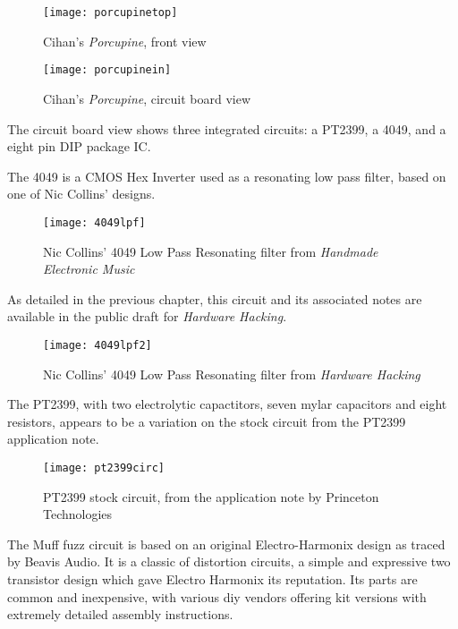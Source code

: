 	\citep{cihan2015}

	\begin{figure}[h!]
	  \caption{Cihan's \emph{Porcupine}, front view}
	  \centering
	    \texttt{[image: porcupinetop]}
	\end{figure}
	
	\begin{figure}[h!]
	  \caption{Cihan's \emph{Porcupine}, circuit board view}
	  \centering
	    \texttt{[image: porcupinein]}
	\end{figure}
	
The circuit board view shows three integrated circuits: a PT2399, a 4049, and a eight pin DIP package IC.

The 4049 is a CMOS Hex Inverter used as a resonating low pass filter, based on one of Nic Collins' designs.

	\begin{figure}[h!]
	  \caption{Nic Collins' 4049 Low Pass Resonating filter from \emph{Handmade Electronic Music}}
	  \centering
	    \texttt{[image: 4049lpf]}
	\end{figure} 
	
As detailed in the previous chapter, this circuit and its associated notes are available in the public draft for \emph{Hardware Hacking}. 

	\begin{figure}[h!]
	  \caption{Nic Collins' 4049 Low Pass Resonating filter from \emph{Hardware Hacking}}
	  \centering
	    \texttt{[image: 4049lpf2]}
	\end{figure} 

The PT2399, with two electrolytic capactitors, seven mylar capacitors and eight resistors, appears to be a variation on the stock circuit from the PT2399 application note.

	\begin{figure}[h!]
	  \caption{PT2399 stock circuit, from the application note by Princeton Technologies}
	  \centering
	    \texttt{[image: pt2399circ]}
	\end{figure}
	
The Muff fuzz circuit is based on an original Electro-Harmonix design as traced by Beavis Audio. It is a classic of distortion circuits, a simple and expressive two transistor design which gave Electro Harmonix its reputation. Its parts are common and inexpensive, with various diy vendors offering kit versions with extremely detailed assembly instructions.


